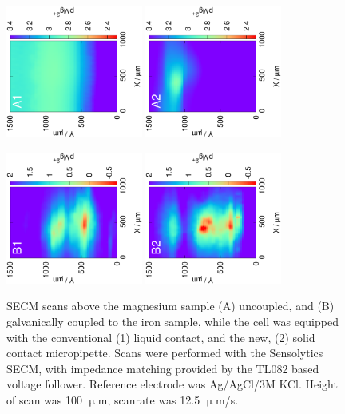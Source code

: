 \begin{figure}
\centering
\includegraphics[trim = 10mm 40mm 0mm 40mm, clip, width=0.4\textwidth, angle=-90]{img/mg_metal/liquid_uncoupled.eps} \includegraphics[trim = 10mm 40mm 0mm 40mm, clip, width=0.4\textwidth, angle=-90]{img/mg_metal/solid_uncoupled.eps}

\includegraphics[trim = 10mm 40mm 0mm 40mm, clip, width=0.4\textwidth, angle=-90]{img/mg_metal/liquid_coupled.eps} \includegraphics[trim = 10mm 40mm 0mm 40mm, clip, width=0.4\textwidth, angle=-90]{img/mg_metal/solid_coupled.eps}
\caption[SECM scans above the magnesium sample with the solid- and liquid contact magnesium ion-selective micropipettes.]{SECM scans above the magnesium sample (A) uncoupled, and (B) galvanically coupled to the iron sample, while the cell was equipped with the conventional (1) liquid contact, and the new, (2) solid contact micropipette.
Scans were performed with the Sensolytics SECM, with impedance matching provided by the TL082 based voltage follower.
Reference electrode was Ag/AgCl/3M KCl.
Height of scan was 100 $\upmu$m, scanrate was 12.5 $\upmu$m/s.}
\label{fig:solid_liquid_corrosion}
\end{figure}

